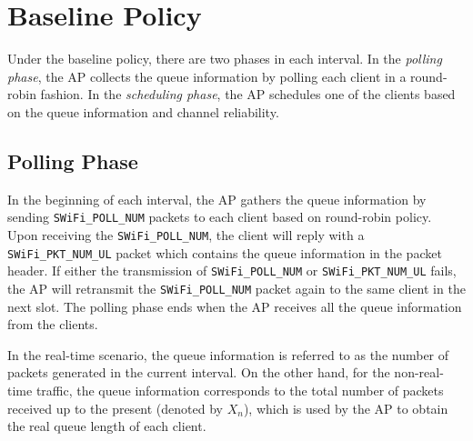 \documentclass{article}
\begin{document}
\section{Baseline Policy}
\label{section: baseline}


\frenchspacing  Under the baseline policy, there are two phases in each interval. In the \emph{polling phase}, the AP collects the queue information by polling each client in a round-robin fashion. In the \emph{scheduling phase}, the AP schedules one of the clients based on the queue information and channel reliability.

\subsection{Polling Phase}
In the beginning of each interval, the AP gathers the queue information by sending \lstinline|SWiFi_POLL_NUM| packets to each client based on round-robin policy. Upon receiving the \lstinline|SWiFi_POLL_NUM|, the client will reply with a \lstinline|SWiFi_PKT_NUM_UL| packet which contains the queue information in the packet header. If either the transmission of \lstinline|SWiFi_POLL_NUM| or \lstinline|SWiFi_PKT_NUM_UL| fails, the AP will retransmit the \lstinline|SWiFi_POLL_NUM| packet again to the same client in the next slot. 
The polling phase ends when the AP receives all the queue information from the clients.

In the real-time scenario, the queue information is referred to as the number of packets generated in the current interval. On the other hand, for the non-real-time traffic, the queue information corresponds to the total number of packets received up to the present (denoted by $X_n$), which is used by the AP to obtain the real queue length of each client.    

\end{document}
